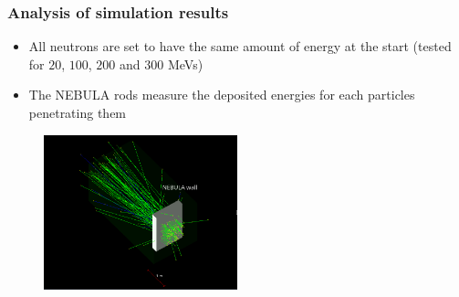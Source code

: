 \begin{frame}
\frametitle{Analysis of simulation results}

\begin{exampleblock}{}
	\begin{itemize}
		\item All neutrons are set to have the same amount of energy at the start (tested for $20$, $100$, $200$ and $300$ MeVs)
		\item The NEBULA rods measure the deposited energies for each particles penetrating them
	\end{itemize}
\end{exampleblock}

\begin{figure}
	\includegraphics[width=0.5\textwidth]{images/nebula_3d.png}
\end{figure}

\end{frame}